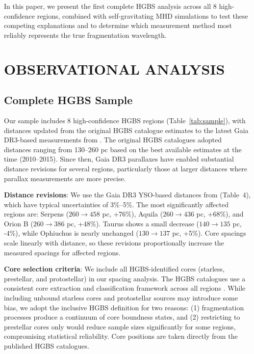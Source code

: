 \documentclass[twocolumn,usenatbib]{mnras}
\begin{document}
In this paper, we present the first complete HGBS analysis across all 8 high-confidence regions, combined with self-gravitating MHD simulations to test these competing explanations and to determine which measurement method most reliably represents the true fragmentation wavelength.

\section{OBSERVATIONAL ANALYSIS}

\subsection{Complete HGBS Sample}

Our sample includes 8 high-confidence HGBS regions (Table~\ref{tab:sample}), with distances updated from the original HGBS catalogue estimates to the latest Gaia DR3-based measurements from \citet{Zhang2023}. The original HGBS catalogues \citep{Konyves2015, Konyves2020, Andre2016, Ladjelate2020} adopted distances ranging from 130--260 pc based on the best available estimates at the time (2010--2015). Since then, Gaia DR3 parallaxes have enabled substantial distance revisions for several regions, particularly those at larger distances where parallax measurements are more precise.

\textbf{Distance revisions}: We use the Gaia DR3 YSO-based distances from \citet{Zhang2023} (Table~4), which have typical uncertainties of 3\%--5\%. The most significantly affected regions are: Serpens ($260 \to 458$ pc, +76\%), Aquila ($260 \to 436$ pc, +68\%), and Orion B ($260 \to 386$ pc, +48\%). Taurus shows a small decrease ($140 \to 135$ pc, -4\%), while Ophiuchus is nearly unchanged ($130 \to 137$ pc, +5\%). Core spacings scale linearly with distance, so these revisions proportionally increase the measured spacings for affected regions.

\textbf{Core selection criteria}: We include all HGBS-identified cores (starless, prestellar, and protostellar) in our spacing analysis. The HGBS catalogues use a consistent core extraction and classification framework across all regions \citep{Konyves2015, Konyves2020}. While including unbound starless cores and protostellar sources may introduce some bias, we adopt the inclusive HGBS definition for two reasons: (1) fragmentation processes produce a continuum of core boundness states, and (2) restricting to prestellar cores only would reduce sample sizes significantly for some regions, compromising statistical reliability. Core positions are taken directly from the published HGBS catalogues.
\end{document}
